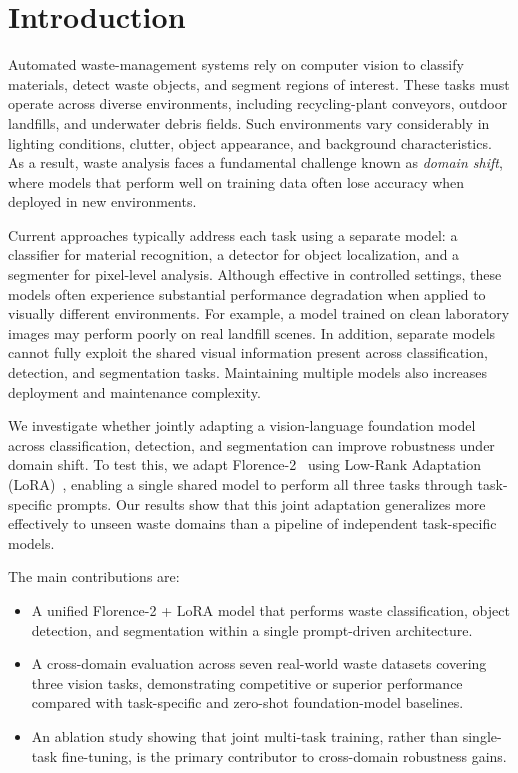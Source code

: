 \documentclass[conference]{IEEEtran}
\begin{document}
\section{Introduction}

Automated waste-management systems rely on computer vision to classify materials, detect waste objects, and segment regions of interest. These tasks must operate across diverse environments, including recycling-plant conveyors, outdoor landfills, and underwater debris fields. Such environments vary considerably in lighting conditions, clutter, object appearance, and background characteristics. As a result, waste analysis faces a fundamental challenge known as \emph{domain shift}, where models that perform well on training data often lose accuracy when deployed in new environments.

Current approaches typically address each task using a separate model: a classifier for material recognition, a detector for object localization, and a segmenter for pixel-level analysis. Although effective in controlled settings, these models often experience substantial performance degradation when applied to visually different environments. For example, a model trained on clean laboratory images may perform poorly on real landfill scenes. In addition, separate models cannot fully exploit the shared visual information present across classification, detection, and segmentation tasks. Maintaining multiple models also increases deployment and maintenance complexity.

We investigate whether jointly adapting a vision-language foundation model across classification, detection, and segmentation can improve robustness under domain shift. To test this, we adapt Florence-2~\cite{florence2} using Low-Rank Adaptation (LoRA)~\cite{lora}, enabling a single shared model to perform all three tasks through task-specific prompts. Our results show that this joint adaptation generalizes more effectively to unseen waste domains than a pipeline of independent task-specific models.

The main contributions are:
\begin{itemize}
\item A unified Florence-2 + LoRA model that performs waste classification, object detection, and segmentation within a single prompt-driven architecture.
\item A cross-domain evaluation across seven real-world waste datasets covering three vision tasks, demonstrating competitive or superior performance compared with task-specific and zero-shot foundation-model baselines.
\item An ablation study showing that joint multi-task training, rather than single-task fine-tuning, is the primary contributor to cross-domain robustness gains.
\end{itemize}
\end{document}

